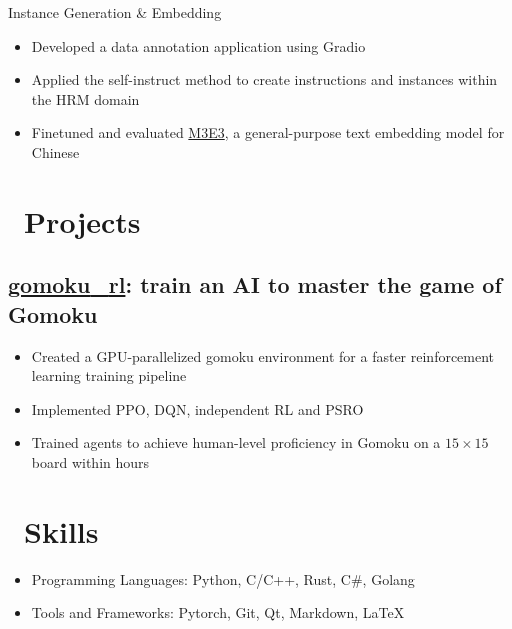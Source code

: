 \documentclass{resume}
\begin{document}
Instance Generation \& Embedding
\begin{itemize}
  \item Developed a data annotation application using Gradio
  \item Applied the self-instruct method to create instructions and instances within the HRM domain
  \item Finetuned and evaluated \href{https://huggingface.co/moka-ai/m3e-base}{M3E3}, a general-purpose text embedding model for Chinese
\end{itemize}

\section{\faRocket\ Projects}

\subsection{\faGithub\space\textbf{\href{https://github.com/hesic73/gomoku_rl}{gomoku{\_}rl}}: train an AI to master the game of Gomoku}

\begin{itemize}
  \item Created a GPU-parallelized gomoku environment for a faster reinforcement learning training pipeline
  \item Implemented PPO, DQN, independent RL and PSRO
  \item Trained agents to achieve human-level proficiency in Gomoku on a $15\times15$ board within hours
\end{itemize}


\section{\faCogs\ Skills}
\begin{itemize}[parsep=0.5ex]
  \item Programming Languages: Python, C/C++, Rust, C\#, Golang
  \item Tools and Frameworks: Pytorch, Git, Qt, Markdown, \LaTeX
\end{itemize}



%
%
\end{document}
